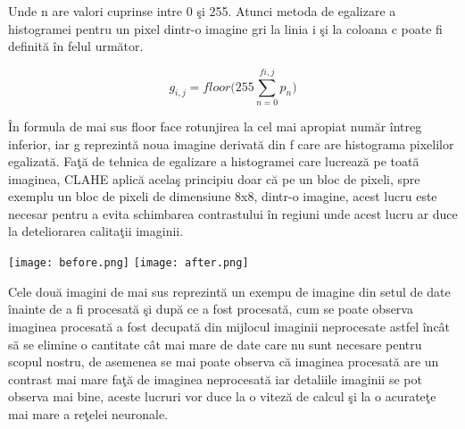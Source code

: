 Unde n are valori cuprinse intre 0 \c{s}i 255. Atunci metoda de egalizare a histogramei pentru un pixel dintr-o imagine gri la linia i \c{s}i la coloana c poate fi definit\u{a} \^{i}n felul urm\u{a}tor.

$$g_{i,j} = floor\bigg( 255 \sum_{n=0}^{f{i,j}} p_n \bigg)$$

\^{I}n formula de mai sus floor face rotunjirea la cel mai apropiat num\u{a}r \^{i}ntreg inferior, iar g reprezint\u{a} noua imagine derivat\u{a} din f care are histograma pixelilor egalizat\u{a}. Fa\c{t}\u{a} de tehnica de egalizare a histogramei care lucreaz\u{a} pe toat\u{a} imaginea, CLAHE aplic\u{a} acela\c{s} principiu doar c\u{a} pe un bloc de pixeli, spre exemplu un bloc de pixeli de dimensiune 8x8, dintr-o imagine, acest lucru este necesar pentru a evita schimbarea contrastului \^{i}n regiuni unde acest lucru ar duce la deteliorarea calita\c{t}ii imaginii.

\texttt{[image: before.png]}
\texttt{[image: after.png]}

Cele dou\u{a} imagini de mai sus reprezint\u{a} un exempu de imagine din setul de date \^{i}nainte de a fi procesat\u{a} \c{s}i dup\u{a} ce a fost procesat\u{a}, cum se poate observa imaginea procesat\u{a} a fost decupat\u{a} din mijlocul imaginii neprocesate astfel \^{i}nc\^{a}t s\u{a} se elimine o cantitate c\^{a}t mai mare de date care nu sunt necesare pentru scopul nostru, de asemenea se mai poate observa c\u{a} imaginea procesat\u{a} are un contrast mai mare fa\c{t}\u{a} de imaginea neprocesat\u{a} iar detaliile imaginii se pot observa mai bine, aceste lucruri vor duce la o vitez\u{a} de calcul \c{s}i la o acurate\c{t}e mai mare a re\c{t}elei neuronale.

\par

